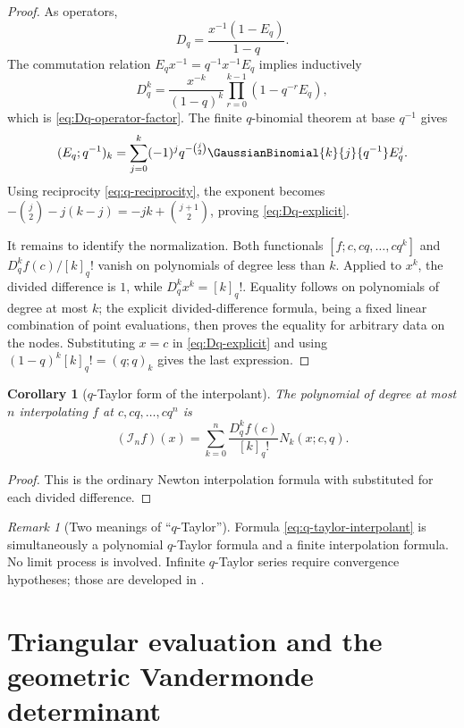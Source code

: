 \documentclass[11pt,oneside]{book}
\numberwithin{equation}{chapter}
\newtheorem{corollary}[theorem]{Corollary}
\theoremstyle{definition}
\theoremstyle{remark}
\newtheorem{remark}[theorem]{Remark}
\newcommand{\Interp}{\mathcal I}
\begin{document}
\begin{proof}
As operators,
\[
 D_q=\frac{x^{-1}(1-E_q)}{1-q}.
\]
The commutation relation $E_qx^{-1}=q^{-1}x^{-1}E_q$ implies inductively
\[
 D_q^k=\frac{x^{-k}}{(1-q)^k}
       \prod_{r=0}^{k-1}(1-q^{-r}E_q),
\]
which is \eqref{eq:Dq-operator-factor}.  The finite $q$-binomial theorem at
base $q^{-1}$ gives
\[
 (E_q;q^{-1})_k
 =\sum_{j=0}^k(-1)^jq^{-\binom j2}
   \GaussianBinomial{k}{j}{q^{-1}}E_q^j.
\]
Using reciprocity \eqref{eq:q-reciprocity}, the exponent becomes
$-\binom j2-j(k-j)=-jk+\binom{j+1}{2}$, proving
\eqref{eq:Dq-explicit}.

It remains to identify the normalization.  Both functionals
$[f;c,cq,\ldots,cq^k]$ and $D_q^kf(c)/[k]_q!$ vanish on polynomials of degree
less than $k$.  Applied to $x^k$, the divided difference is $1$, while
$D_q^kx^k=[k]_q!$.  Equality follows on polynomials of degree at most $k$;
the explicit divided-difference formula, being a fixed linear combination of
point evaluations, then proves the equality for arbitrary data on the nodes.
Substituting $x=c$ in \eqref{eq:Dq-explicit} and using
$(1-q)^k[k]_q!=(q;q)_k$ gives the last expression.
\end{proof}

\begin{corollary}[$q$-Taylor form of the interpolant]
\label{cor:q-taylor-interpolant}
The polynomial of degree at most $n$ interpolating $f$ at
$c,cq,\ldots,cq^n$ is
\begin{equation}
 \boxed{
 (\Interp_nf)(x)=\sum_{k=0}^n
 \frac{D_q^kf(c)}{[k]_q!}N_k(x;c,q).}
 \label{eq:q-taylor-interpolant}
\end{equation}
\end{corollary}

\begin{proof}
This is the ordinary Newton interpolation formula with
 substituted for each divided difference.
\end{proof}

\begin{remark}[Two meanings of ``$q$-Taylor'']
Formula \eqref{eq:q-taylor-interpolant} is simultaneously a polynomial
$q$-Taylor formula and a finite interpolation formula.  No limit process is
involved.  Infinite $q$-Taylor series require convergence hypotheses; those
are developed in .
\end{remark}

\section{Triangular evaluation and the geometric Vandermonde determinant}
\end{document}
